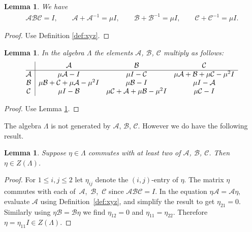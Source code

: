 \documentclass[pdftex]{sigma}
\numberwithin{equation}{section}
\newtheorem{Lemma}[Theorem]{Lemma}
\begin{document}
\begin{Lemma}
\label{lem:xyz}
We have
\begin{gather*}
\mathcal A \mathcal B\mathcal C=I, \qquad
\mathcal A+{\mathcal A}^{-1}=\mu I,
\qquad
\mathcal B+{\mathcal B}^{-1}=\mu I,
\qquad
\mathcal C+{\mathcal C}^{-1}=\mu I.
\end{gather*}
\end{Lemma}

\begin{proof}
Use Def\/inition
\ref{def:xyz}.
\end{proof}

\begin{Lemma}
\label{lem:multtable2}
In the algebra $\Lambda $ the elements $\mathcal A$, $\mathcal B$, $\mathcal C$
multiply as follows:
\[
\begin{array}{@{}c| c c c}
 &  \mathcal A & \mathcal B  & \mathcal C \\
\hline
\mathcal A &   \mu \mathcal A  - I &   \mu I - \mathcal C
&  \mu \mathcal A  + \mathcal B + \mu \mathcal C  -\mu^2 I \\
\mathcal B
&
\mu \mathcal B + \mathcal C + \mu \mathcal A  -\mu^2 I
&
  \mu \mathcal B - I
&
 \mu I- \mathcal A
\\
\mathcal C
&
 \mu I - \mathcal B
&
\mu \mathcal C  + \mathcal A + \mu \mathcal B  -\mu^2 I
&
\mu \mathcal C - I
\end{array}
\]
\end{Lemma}

\begin{proof}
Use Lemma
\ref{lem:xyz}.
\end{proof}




 The algebra $\Lambda $ is not generated by
$\mathcal A$, $\mathcal B$, $\mathcal C$. However
we do have the following result.

\begin{Lemma}
\label{lem:whatittakes}
Suppose  $\eta  \in \Lambda $ commutes with at
 least two of
$\mathcal A$, $\mathcal B$, $\mathcal C$.
Then $\eta  \in Z(\Lambda )$.
\end{Lemma}

\begin{proof}
For $1 \leq i,j\leq 2$
let $\eta_{ij}$ denote the $(i,j)$-entry of $\eta$.
The matrix $\eta $ commutes with each of~$\mathcal A$,~$\mathcal B$,~$\mathcal C$
since $\mathcal A\mathcal B\mathcal C=I$.
In the equation $\eta \mathcal A=\mathcal A \eta  $,
evaluate $\mathcal A$ using Def\/inition~\ref{def:xyz}, and simplify the result to get
$\eta_{21}=0$. Similarly using $\eta \mathcal B=\mathcal B\eta $
we f\/ind $\eta_{12}=0$ and
$\eta_{11}=\eta_{22}$.
Therefore $\eta =\eta_{11} I\in Z(\Lambda )$.
\end{proof}
\end{document}
